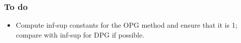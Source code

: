 \begin{frame}
\frametitle{To do}

\begin{itemize}
\item Compute inf-sup constants for the OPG method and ensure that it is 1; compare with inf-sup for DPG if possible.
\end{itemize}

\end{frame}
